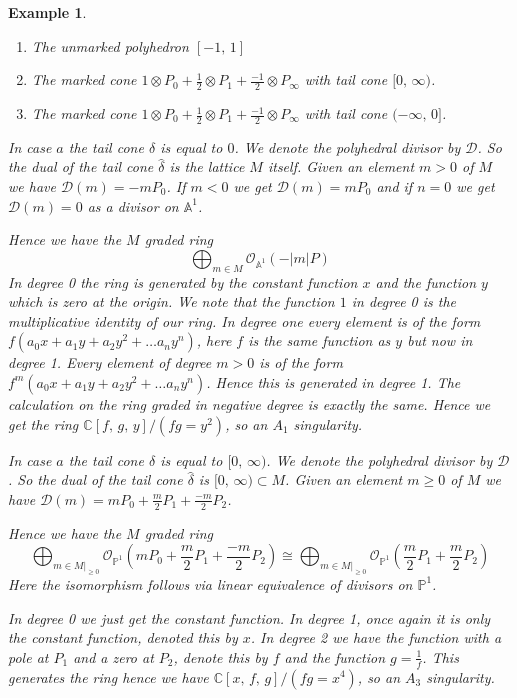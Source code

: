 \documentclass[11pt]{amsart}
\theoremstyle{plain}
\newtheorem{ex}[thm]{Example}
\begin{document}
\begin{ex}
\begin{enumerate}[label =\alph*)]
\item The unmarked polyhedron $[-1, \, 1]$
\item The marked cone $1\otimes P_0 + \frac{1}{2} \otimes P_1 + \frac{-1}{2} \otimes P_\infty$ with tail cone $[0,\, \infty)$.
\item The marked cone $1\otimes P_0 + \frac{1}{2} \otimes P_1 + \frac{-1}{2} \otimes P_\infty$ with tail cone $(-\infty, \, 0]$.
\end{enumerate}

In case $a$ the tail cone $\delta$ is equal to $0$. We denote the polyhedral divisor by $\mathcal{D}$. So the dual of the tail cone $\hat{\delta}$ is the lattice $M$ itself. Given an element $ m >0$ of $M$ we have $\mathcal{D}(m) = -mP_0$. If $m <0$ we get $\mathcal{D}(m) = mP_0$ and if $n=0$ we get $\mathcal{D}(m) = 0$ as a divisor on $\mathbb{A}^1$. 

Hence we have the $M$ graded ring
\[
\bigoplus_{m \in M} \mathcal{O}_{\mathbb{A}^1}(-|m|P)
\]
In degree 0 the ring is generated by the constant function $x$ and the function $y$ which is zero at the origin. We note that the function $1$ in degree 0 is the multiplicative identity of our ring. In degree one every element is of the form $f ( a_0 x + a_1 y + a_2 y^2 + \dots  a_n y^n)$, here $f$ is the same function as $y$ but now in degree 1. Every element of degree $m>0$ is of the form $f^m ( a_0 x + a_1 y + a_2 y^2 + \dots  a_n y^n)$. Hence this is generated in degree 1. The calculation on the ring graded in negative degree is exactly the same.  Hence we get the ring $\mathbb{C}[f,  \, g, \, y]/ (fg=y^2)$, so an $A_1$ singularity.


In case $a$ the tail cone $\delta$ is equal to $[0 ,  \, \infty)$. We denote the polyhedral divisor by $\mathcal{D}$. So the dual of the tail cone $\hat{\delta}$ is $[0 ,  \, \infty) \subset M$. Given an element $ m \geq 0$ of $M$ we have $\mathcal{D}(m) = mP_0 +\frac{m}{2} P_1 + \frac{-m}{2}P_2$. 

Hence we have the $M$ graded ring
\[
\bigoplus_{m \in M|_{\geq 0}} \mathcal{O}_{\mathbb{P}^1} \left(mP_0 +\frac{m}{2} P_1 + \frac{-m}{2}P_2 \right) \cong \bigoplus_{m \in M|_{\geq 0}} \mathcal{O}_{\mathbb{P}^1} \left(\frac{m}{2} P_1 + \frac{m}{2}P_2 \right)
\]
Here the isomorphism follows via linear equivalence of divisors on $\mathbb{P}^1$.

In degree 0 we just get the constant function. In degree 1, once again it is only the constant function, denoted this by $x$. In degree 2 we have the function with a pole at $P_1$ and a zero at $P_2$, denote this by $f$ and the function $g = \frac{1}{f}$. This generates the ring hence we have $\mathbb{C}[x, \, f, \, g]/(fg = x^4)$, so an $A_3$ singularity.



\end{ex}
\end{document}
